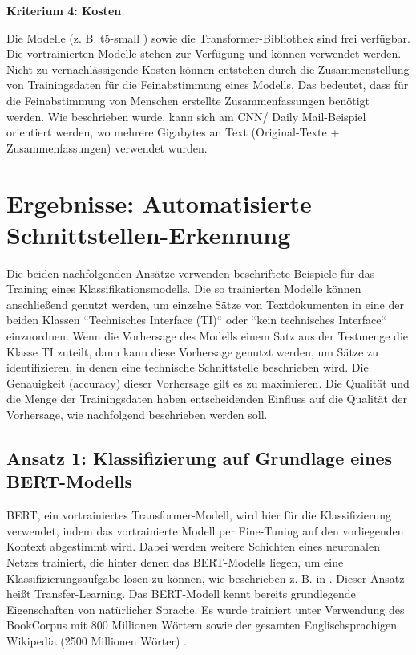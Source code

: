 {\bf Kriterium 4: Kosten}

Die Modelle (z. B. t5-small \cite{t5}) sowie die Transformer-Bibliothek \cite{Transformers} sind frei verfügbar. Die vortrainierten Modelle stehen zur Verfügung und können verwendet werden. Nicht zu vernachlässigende Kosten können entstehen durch die Zusammenstellung von Trainingsdaten für die Feinabstimmung eines Modells. Das bedeutet, dass für die Feinabstimmung von Menschen erstellte Zusammenfassungen benötigt werden. Wie beschrieben wurde, kann sich am CNN/ Daily Mail-Beispiel orientiert werden, wo mehrere Gigabytes an Text (Original-Texte + Zusammenfassungen) verwendet wurden. 

\section{Ergebnisse: Automatisierte Schnittstellen-Erkennung}

Die beiden nachfolgenden Ansätze verwenden beschriftete Beispiele für das Training eines Klassifikationsmodells. Die so trainierten Modelle können anschließend genutzt werden, um einzelne Sätze von Textdokumenten in eine der beiden Klassen ``Technisches Interface (TI)`` oder ``kein technisches Interface`` einzuordnen. Wenn die Vorhersage des Modells einem Satz aus der Testmenge die Klasse TI zuteilt, dann kann diese Vorhersage genutzt werden, um Sätze zu identifizieren, in denen eine technische Schnittstelle beschrieben wird. Die Genauigkeit (accuracy) dieser Vorhersage gilt es zu maximieren. Die Qualität und die Menge der Trainingsdaten haben entscheidenden Einfluss auf die Qualität der Vorhersage, wie nachfolgend beschrieben werden soll.

\subsection{Ansatz 1: Klassifizierung auf Grundlage eines BERT-Modells}

BERT, ein vortrainiertes Transformer-Modell, wird hier für die Klassifizierung verwendet, indem das vortrainierte Modell per Fine-Tuning auf den vorliegenden Kontext abgestimmt wird. Dabei werden weitere Schichten eines neuronalen Netzes trainiert, die hinter denen das BERT-Modells liegen, um eine Klassifizierungsaufgabe lösen zu können, wie beschrieben z. B. in \cite[S. 2]{Tang}. Dieser Ansatz heißt Transfer-Learning. Das BERT-Modell kennt bereits grundlegende Eigenschaften von natürlicher Sprache. Es wurde trainiert unter Verwendung des BookCorpus mit 800 Millionen Wörtern sowie der gesamten Englischsprachigen Wikipedia (2500 Millionen Wörter) \cite{devlin}.


